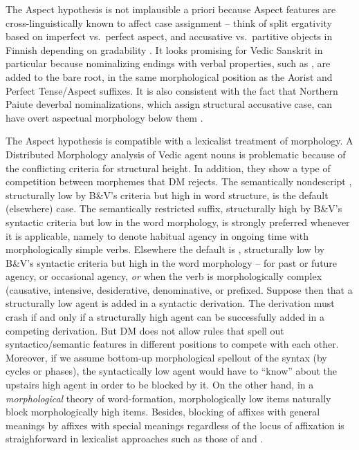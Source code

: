 \documentclass[output=paper,
modfonts
]{LSP/langsci}
\def\urf#1{$^{\textrm{\scriptsize{#1}}}$}
\begin{document}
The Aspect hypothesis is not implausible a priori because Aspect features are
cross-linguistically known to affect case assignment  – think of split ergativity
based on imperfect vs.\ perfect aspect, and accusative vs.\ partitive objects in Finnish
depending on gradability \citep{kiparsky2005b}.  It looks promising
for Vedic Sanskrit in particular because nominalizing endings with verbal properties, such as
\form{′-tar-\urf{V}}, are added to the bare root, in the same morphological position as the
Aorist and Perfect Tense/Aspect suffixes.  It is also consistent with the fact that Northern
Paiute deverbal nominalizations, which assign structural accusative case, can have overt
aspectual morphology below them \citep[793, fn.\ 6]{toosarvandani2014}.

The Aspect hypothesis is compatible with a lexicalist treatment of morphology.  A Distributed
Morphology analysis of Vedic agent nouns is problematic because of the conflicting criteria for
structural height.  In addition, they show a type of competition between morphemes that DM
rejects.  The semantically nondescript \form{-tár-\urf{N}}, structurally low by B\&V's
criteria but high in word structure, is the default (elsewhere) case.  The semantically
restricted \form{′-tar-\urf{V}} suffix, structurally high by B\&V's syntactic criteria but
low in the word morphology, is strongly preferred whenever it is applicable, namely to denote
habitual agency in ongoing time with morphologically simple verbs.  Elsewhere the default is
\form{-tár-\urf{N}}, structurally low by B\&V's syntactic criteria but high in the word
morphology – for past or future agency, or occasional agency, \textit{or} when the
verb is morphologically complex (causative, intensive, desiderative, denominative, or prefixed.
Suppose then that a structurally low agent is added in a syntactic derivation.  The derivation
must crash if and only if a structurally high agent can be successfully added in a competing
derivation.  But DM does not allow rules that spell out syntactico/semantic features in
different positions to compete with each other.  Moreover, if we assume bottom-up morphological
spellout of the syntax (by cycles or phases), the syntactically low agent would have to
``know'' about the upstairs high agent in order to be blocked by it.  On the other hand, in a
\textit{morphological} theory of word-formation, morphologically low items naturally block
morphologically high items.  Besides, blocking of affixes with general meanings by affixes with
special meanings regardless of the locus of affixation is straighforward in lexicalist
approaches such as those of \citet{wunderlich1996k,wunderlich2001k} and \citet{kiparsky2005}.
\end{document}
